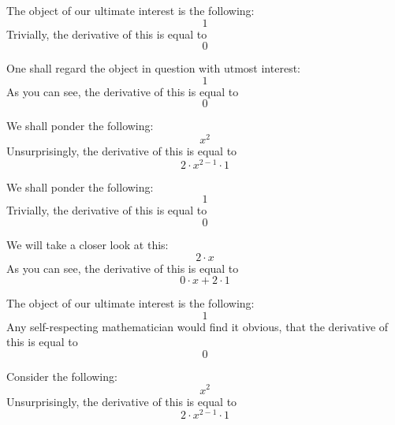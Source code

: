 \documentclass{article}
\begin{document}
The object of our ultimate interest is the following:
\begin{equation}
1 
\end{equation}
Trivially, the derivative of this is equal to
\begin{equation}
0 
\end{equation}

One shall regard the object in question with utmost interest:
\begin{equation}
1 
\end{equation}
As you can see, the derivative of this is equal to
\begin{equation}
0 
\end{equation}

We shall ponder the following:
\begin{equation}
x ^{2 } 
\end{equation}
Unsurprisingly, the derivative of this is equal to
\begin{equation}
2 \cdot x ^{2 - 1 } \cdot 1 
\end{equation}

We shall ponder the following:
\begin{equation}
1 
\end{equation}
Trivially, the derivative of this is equal to
\begin{equation}
0 
\end{equation}

We will take a closer look at this:
\begin{equation}
2 \cdot x 
\end{equation}
As you can see, the derivative of this is equal to
\begin{equation}
0 \cdot x + 2 \cdot 1 
\end{equation}

The object of our ultimate interest is the following:
\begin{equation}
1 
\end{equation}
Any self-respecting mathematician would find it obvious, that the derivative of this is equal to
\begin{equation}
0 
\end{equation}

Consider the following:
\begin{equation}
x ^{2 } 
\end{equation}
Unsurprisingly, the derivative of this is equal to
\begin{equation}
2 \cdot x ^{2 - 1 } \cdot 1 
\end{equation}
\end{document}
